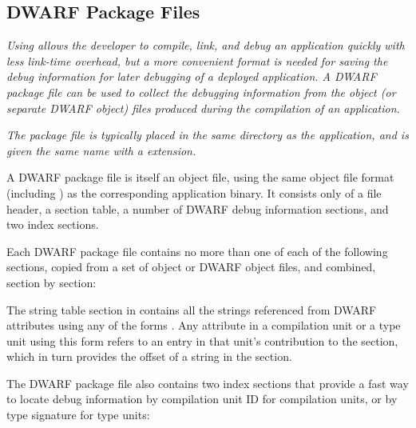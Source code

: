 \subsection{DWARF Package Files}
\label{datarep:dwarfpackagefiles}
\textit{Using  allows the developer to compile, 
link, and debug an application quickly with less link-time overhead,
but a more convenient format is needed for saving the debug
information for later debugging of a deployed application. A
DWARF package file can be used to collect the debugging
information from the object (or separate DWARF object) files
produced during the compilation of an application.}

\textit{The package file is typically placed in the same directory as the
application, and is given the same name with a 
extension.}

A DWARF package file is itself an object file, using the
same object file format (including \byteorder) as the
corresponding application binary. It consists only of a file
header, a section table, a number of DWARF debug information
sections, and two index sections.

Each DWARF package file contains no more than one of each of the
following sections, copied from a set of object or DWARF object
files, and combined, section by section:
\begin{alltt}
    \dotdebuginfodwo
    \dotdebugabbrevdwo
    \dotdebuglinedwo
    \dotdebugloclistsdwo
    \dotdebugrnglistsdwo
    \dotdebugstroffsetsdwo
    \dotdebugstrdwo
    \dotdebugmacrodwo
\end{alltt}

The string table section in \dotdebugstrdwo{} contains all the
strings referenced from DWARF attributes using 
any of the forms
\DWFORMstrxXNor. Any attribute in a compilation unit or a type
unit using this form refers to an entry in that unit's
contribution to the \dotdebugstroffsetsdwo{} section, which in turn
provides the offset of a string in the \dotdebugstrdwo{}
section.

The DWARF package file also contains two index sections that
provide a fast way to locate debug information by compilation
unit ID for compilation units, or by type
signature for type units:
\begin{alltt}
    \dotdebugcuindex
    \dotdebugtuindex
\end{alltt}

